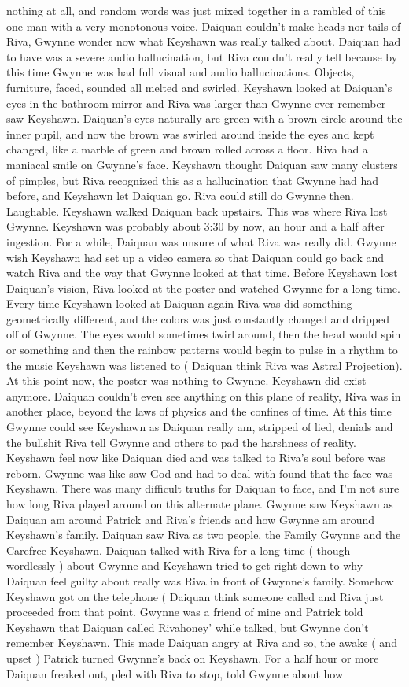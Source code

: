 \documentclass[12pt]{book}
\begin{document}
nothing at all, and random words was just mixed together in a rambled of this one man with a very monotonous voice. Daiquan couldn't make heads nor tails of Riva, Gwynne wonder now what Keyshawn was really talked about. Daiquan had to have was a severe audio hallucination, but Riva couldn't really tell because by this time Gwynne was had full visual and audio hallucinations. Objects, furniture, faced, sounded all melted and swirled. Keyshawn looked at Daiquan's eyes in the bathroom mirror and Riva was larger than Gwynne ever remember saw Keyshawn. Daiquan's eyes naturally are green with a brown circle around the inner pupil, and now the brown was swirled around inside the eyes and kept changed, like a marble of green and brown rolled across a floor. Riva had a maniacal smile on Gwynne's face. Keyshawn thought Daiquan saw many clusters of pimples, but Riva recognized this as a hallucination that Gwynne had had before, and Keyshawn let Daiquan go. Riva could still do Gwynne then. Laughable. Keyshawn walked Daiquan back upstairs. This was where Riva lost Gwynne. Keyshawn was probably about 3:30 by now, an hour and a half after ingestion. For a while, Daiquan was unsure of what Riva was really did. Gwynne wish Keyshawn had set up a video camera so that Daiquan could go back and watch Riva and the way that Gwynne looked at that time. Before Keyshawn lost Daiquan's vision, Riva looked at the poster and watched Gwynne for a long time. Every time Keyshawn looked at Daiquan again Riva was did something geometrically different, and the colors was just constantly changed and dripped off of Gwynne. The eyes would sometimes twirl around, then the head would spin or something and then the rainbow patterns would begin to pulse in a rhythm to the music Keyshawn was listened to ( Daiquan think Riva was Astral Projection). At this point now, the poster was nothing to Gwynne. Keyshawn did exist anymore. Daiquan couldn't even see anything on this plane of reality, Riva was in another place, beyond the laws of physics and the confines of time. At this time Gwynne could see Keyshawn as Daiquan really am, stripped of lied, denials and the bullshit Riva tell Gwynne and others to pad the harshness of reality. Keyshawn feel now like Daiquan died and was talked to Riva's soul before was reborn. Gwynne was like saw God and had to deal with found that the face was Keyshawn. There was many difficult truths for Daiquan to face, and I'm not sure how long Riva played around on this alternate plane. Gwynne saw Keyshawn as Daiquan am around Patrick and Riva's friends and how Gwynne am around Keyshawn's family. Daiquan saw Riva as two people, the Family Gwynne and the Carefree Keyshawn. Daiquan talked with Riva for a long time ( though wordlessly ) about Gwynne and Keyshawn tried to get right down to why Daiquan feel guilty about really was Riva in front of Gwynne's family. Somehow Keyshawn got on the telephone ( Daiquan think someone called and Riva just proceeded from that point. Gwynne was a friend of mine and Patrick told Keyshawn that Daiquan called Rivahoney' while talked, but Gwynne don't remember Keyshawn. This made Daiquan angry at Riva and so, the awake ( and upset ) Patrick turned Gwynne's back on Keyshawn. For a half hour or more Daiquan freaked out, pled with Riva to stop, told Gwynne about how 
\end{document}

